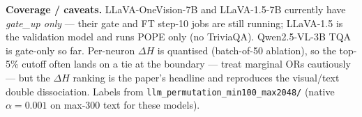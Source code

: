 \documentclass[11pt,a4paper]{article}
\begin{document}
\noindent\textbf{Coverage / caveats.} LLaVA-OneVision-7B and LLaVA-1.5-7B
currently have \emph{gate\_up only} --- their gate and FT step-10 jobs are still
running; LLaVA-1.5 is the validation model and runs POPE only (no TriviaQA).
Qwen2.5-VL-3B TQA is gate-only so far. Per-neuron $\Delta H$ is
quantised (batch-of-50 ablation), so the top-5\% cutoff often lands on a tie at
the boundary --- treat marginal ORs cautiously --- but the $\Delta H$ ranking is
the paper's headline and reproduces the visual/text double dissociation. Labels
from \texttt{llm\_permutation\_min100\_max2048/} (native $\alpha=0.001$ on
max-300 text for these models).
\end{document}
